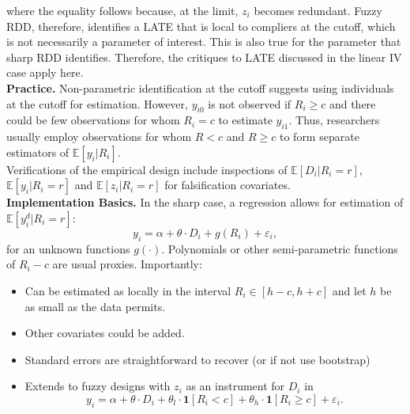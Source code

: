 \noindent where the equality follows because, at the limit, $z_i$ becomes redundant. Fuzzy RDD, therefore, identifies a LATE that is local to compliers at the cutoff, which is not necessarily a parameter of interest. This is also true for the parameter that sharp RDD identifies. Therefore, the critiques to LATE discussed in the linear IV case apply here.\\

\noindent \textbf{Practice.} Non-parametric identification at the cutoff suggests using individuals at the cutoff for estimation. However, $y_{i0}$ is not observed if $R_{i} \geq c$ and there could be few observations for whom $R_{i} = c$ to estimate $y_{i1}$. Thus, researchers usually employ observations for whom $R < c $ and $R \geq c $ to form separate estimators of $\mathbb{E} \left[ y_{i} | R_{i} \right] $.\\

\noindent Verifications of the empirical design include inspections of $\mathbb{E} \left[ D_i | R_i = r \right]$, $\mathbb{E} \left[ y_i | R_i = r \right]$ and $\mathbb{E} \left[ z_i | R_i = r \right]$ for falsification covariates.\\ 

\noindent \textbf{Implementation Basics.} In the sharp case, a regression allows for estimation of $\mathbb{E} \left[ y_{i}^d | R_{i} = r \right]$: 
\begin{equation}
y_{i} = \alpha + \theta \cdot D_{i} + g \left( R_i \right) + \varepsilon_{i}, 
\end{equation}
\noindent for an unknown functions $g \left( \cdot \right)$. Polynomials or other semi-parametric functions of $R_{i} - c$ are usual proxies. Importantly:

\begin{itemize}
\item Can be estimated as locally in the interval $R_{i} \in \left[ h - c, h + c \right]$ and let $h$ be as small as the data permits. 
\item Other covariates could be added. 
\item Standard errors are straightforward to recover (or if not use bootstrap)
\item Extends to fuzzy designs with $z_{i}$ as an instrument for $D_{i}$ in 
\begin{equation}
y_{i} = \alpha + \theta \cdot D_{i} + \theta_l \cdot \bm{1} \left[ R_i < c \right]  + \theta_h \cdot \bm{1} \left[ R_i \geq c \right]  + \varepsilon_{i}.
\end{equation}
\end{itemize}


